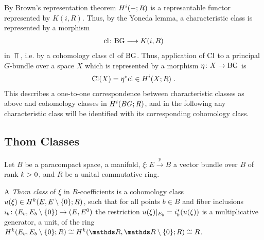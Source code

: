 \begin{Rem}
  By Brown's representation theorem %
  $H^i(-;R)$ is a represantable functor represented by $K(i,R)$.
  Thus, by the Yoneda lemma, a characteristic class is
  represented by a morphism
  \begin{gather*}
    \mathrm{cl}\colon \mathrm{BG} \longrightarrow K(i, R)
  \end{gather*}
  in $\Top$, i.e. by a cohomology class $\mathrm{cl}$ of $\mathrm{BG}$.
  Thus, application of $\mathrm{Cl}$ to a principal $G$-bundle over a
  space $X$ which is represented by a morphism $\eta\colon X\to\mathrm{BG}$ %
  is
  \begin{gather*}
    \mathrm{Cl}(X) = {\eta}^* \mathrm{cl} \in H^i(X;R)
    \;.
  \end{gather*}
  This describes a one-to-one correspondence between
  characteristic classes as above and cohomology classes in
  $H^i(BG;R)$, and in the following any characteristic class will be
  identified with its corresponding cohomology class.
\end{Rem}

\begin{Rem}
\end{Rem}

\subsection{Thom Classes}
Let $B$ be a paracompact space, \forexample a manifold,
$\xi\colon E\xrightarrow{p} B$ a vector bundle over $B$ of rank $k>0$,
and $R$ be a unital commutative ring.
\begin{Def}
  A \emph{Thom class} of $\xi$ in $R$-coefficients is a
  cohomology class ${u}(\xi)\in H^{k}(E, {E}\setminus\{0\}; R)$,
  such that for all points $b\in B$ and fiber inclusions
  $i_b\colon (E_b, {E_b}\setminus\{0\}) \to (E, {E}^0)$
  the restriction ${u}(\xi)|_{E_b} = {i}^*_b ({u}(\xi))$ is a
  multiplicative generator,
  \idest a unit, %
  of the ring
  $\H^{\rkk}(\spherepair{E_b};R)\cong \H^{\rkk}(\spherepair{\R}; R)\cong R$.
\end{Def}

